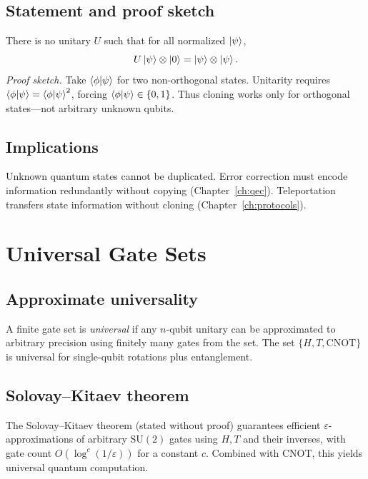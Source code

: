 \subsection{Statement and proof sketch}

There is no unitary $U$ such that for all normalized $\ket{\psi}$,
\begin{equation}
U\ket{\psi}\otimes\ket{0}=\ket{\psi}\otimes\ket{\psi}.
\label{eq:clone-attempt}
\end{equation}
\emph{Proof sketch.} Take $\braket{\phi|\psi}$ for two non-orthogonal states. Unitarity requires $\braket{\phi|\psi}=\braket{\phi|\psi}^2$, forcing $\braket{\phi|\psi}\in\{0,1\}$. Thus cloning works only for orthogonal states---not arbitrary unknown qubits.

\subsection{Implications}

Unknown quantum states cannot be duplicated. Error correction must encode information redundantly without copying (Chapter~\ref{ch:qec}). Teleportation transfers state information without cloning (Chapter~\ref{ch:protocols}).

\section{Universal Gate Sets}
\label{sec:universal}

\subsection{Approximate universality}

A finite gate set is \emph{universal} if any $n$-qubit unitary can be approximated to arbitrary precision using finitely many gates from the set. The set $\{H,T,\mathrm{CNOT}\}$ is universal for single-qubit rotations plus entanglement.

\subsection{Solovay--Kitaev theorem}

The Solovay--Kitaev theorem (stated without proof) guarantees efficient $\varepsilon$-approximations of arbitrary $\mathrm{SU}(2)$ gates using $H,T$ and their inverses, with gate count $O(\log^c(1/\varepsilon))$ for a constant $c$. Combined with CNOT, this yields universal quantum computation.

